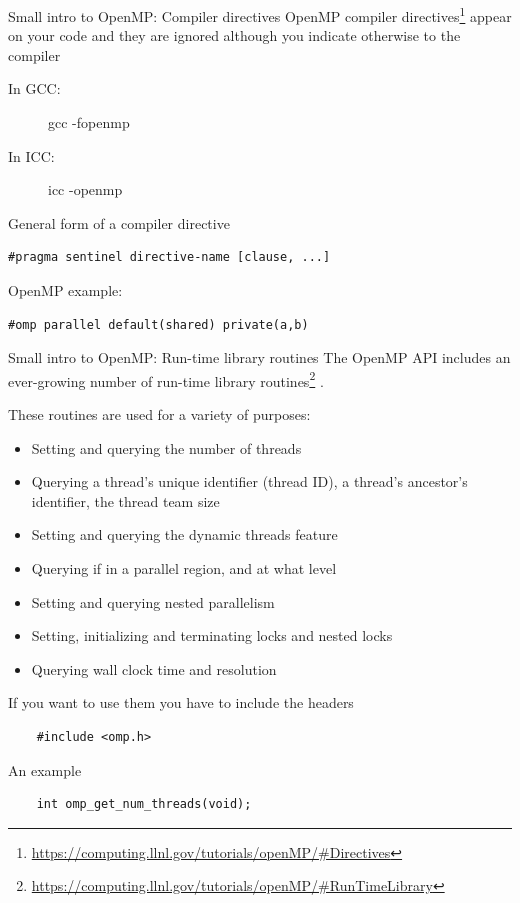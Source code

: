 \documentclass[10pt,xcolor=table]{beamer}
\begin{document}
\begin{frame}[fragile]{Small intro to OpenMP: Compiler directives}
OpenMP compiler directives\footnote{\url{https://computing.llnl.gov/tutorials/openMP/\#Directives}}  appear on your code and they are ignored although you indicate otherwise to the compiler
\begin{description}
\item[In GCC:] gcc -fopenmp
\item[In ICC:] icc -openmp
\end{description}

General form of a compiler directive

\begin{verbatim}
#pragma sentinel directive-name [clause, ...]
\end{verbatim}

OpenMP example:

\begin{verbatim}
#omp parallel default(shared) private(a,b)
\end{verbatim}

\end{frame}

\begin{frame}[fragile]{Small intro to OpenMP: Run-time library routines}
The OpenMP API includes an ever-growing number of run-time library routines\footnote{\url{https://computing.llnl.gov/tutorials/openMP/\#RunTimeLibrary}} .

These routines are used for a variety of purposes:

\begin{itemize}
    \tiny
    \item Setting and querying the number of threads
    \item Querying a thread's unique identifier (thread ID), a thread's ancestor's identifier, the thread team size
    \item Setting and querying the dynamic threads feature
    \item Querying if in a parallel region, and at what level
    \item Setting and querying nested parallelism
    \item Setting, initializing and terminating locks and nested locks
    \item Querying wall clock time and resolution
\end{itemize}

If you want to use them you have to include the headers

\begin{verbatim}
    #include <omp.h>
\end{verbatim}

An example

\begin{verbatim}
    int omp_get_num_threads(void);
\end{verbatim}

\end{frame}
\end{document}

